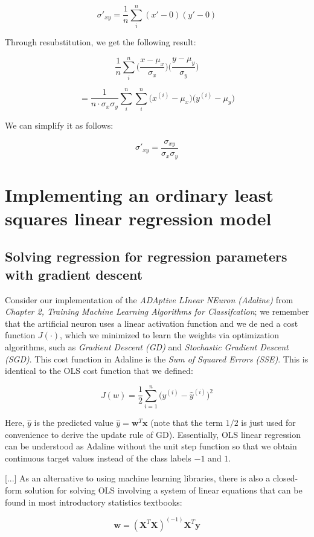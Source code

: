 \documentclass[letterpaper]{report}
\begin{document}
\[
\sigma'_{xy} = \frac{1}{n} \sum_{i}^{n} (x' - 0)(y' - 0)
\]

Through resubstitution, we get the following result:

\[
\frac{1}{n} \sum_{i}^{n} \Big( \frac{x - \mu_x}{\sigma_x}  \Big) \Big( \frac{y - \mu_y}{\sigma_y} \Big)
\]

\[
= \frac{1}{n \cdot \sigma_x \sigma_y} \sum^{n}_{i} \sum_{i}^{n} \big(x^{(i)} - \mu_x \big) \big(y^{(i)} - \mu_y \big)
\]
 
We can simplify it as follows:

\[
\sigma'_{xy} = \frac{\sigma_{xy}}{\sigma_x \sigma_y}
\]

\section{Implementing an ordinary least squares linear regression model}
\subsection{Solving regression for regression parameters with gradient descent}

Consider our implementation of the \textit{ADAptive LInear NEuron (Adaline)} from \textit{Chapter 2, Training Machine Learning Algorithms for Classifcation}; we remember that the artificial neuron uses a linear activation function and we de ned a cost function $J (\cdot)$, which we minimized to learn the weights via optimization algorithms, such as \textit{Gradient Descent (GD)} and \textit{Stochastic Gradient Descent (SGD)}. This cost function in Adaline is the \textit{Sum of Squared Errors (SSE)}. This is identical to the OLS cost function that we defined:

\[
J(w) = \frac{1}{2} \sum_{i=1}^{n} \big( y^{(i)} -  \hat{y}^{(i)} \big)^2
\]

Here, $\hat{y}$ is the predicted value $\hat{y} = \mathbf{w}^T\mathbf{x}$  (note that the term $1/2$ is just used for convenience to derive the update rule of GD). Essentially, OLS linear regression can be understood as Adaline without the unit step function so that we obtain continuous target values instead of the class labels $-1$ and $1$.

[...] As an alternative to using machine learning libraries, there is also
a closed-form solution for solving OLS involving a system of linear equations that can be found in most introductory statistics textbooks:

\[
\mathbf{w} = (\mathbf{X}^T \mathbf{X})^{(-1)} \mathbf{X}^T \mathbf{y}
\]
\end{document}
